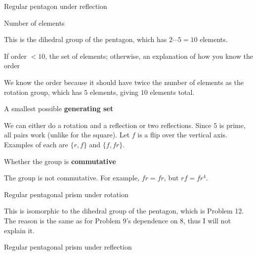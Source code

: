 \documentclass[../gatm_answers.tex]{subfiles}
\begin{document}
\begin{outer_problem}
\item Regular pentagon under reflection
\end{outer_problem}

\begin{inner_problem}[start=1]
\item Number of elements
\end{inner_problem}

\noindent This is the dihedral group of the pentagon, which has $2\cdots 5=10$ elements.

\begin{inner_problem}
\item If order $< 10$, the set of elements; otherwise, an explanation of how you know the order
\end{inner_problem}

\noindent We know the order because it should have twice the number of elements as the rotation group, which has $5$ elements, giving $10$ elements total.

\begin{inner_problem}
\item A smallest possible \textbf{generating set}
\end{inner_problem}

\noindent We can either do a rotation and a reflection or two reflections. Since $5$ is prime, all pairs work (unlike for the square). Let $f$ is a flip over the vertical axis. Examples of each are $\{r,f\}$ and $\{f,fr\}$.

\begin{inner_problem}
\item Whether the group is \textbf{commutative}
\end{inner_problem}

\noindent The group is not commutative. For example, $fr=fr$, but $rf=fr^4$.

\begin{outer_problem}
\item Regular pentagonal prism under rotation
\end{outer_problem}

\noindent This is isomorphic to the dihedral group of the pentagon, which is Problem 12. The reason is the same as for Problem 9's dependence on 8, thus I will not explain it.

\begin{outer_problem}
\item Regular pentagonal prism under reflection
\end{outer_problem}
\end{document}
